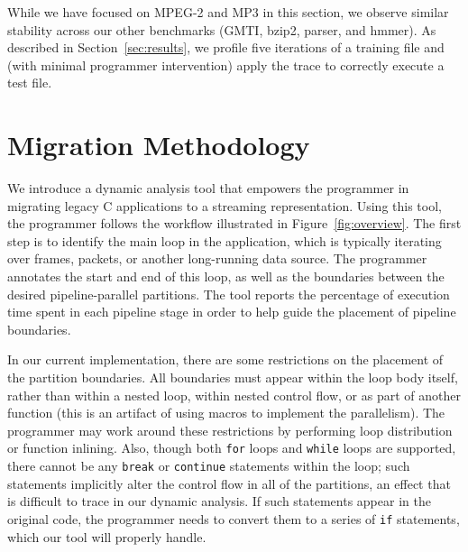 % 

While we have focused on MPEG-2 and MP3 in this section, we observe
similar stability across our other benchmarks (GMTI, bzip2, parser,
and hmmer).  As described in Section~\ref{sec:results}, we profile
five iterations of a training file and (with minimal programmer
intervention) apply the trace to correctly execute a test file.

\section{Migration Methodology}
\label{sec:workflow}

We introduce a dynamic analysis tool that empowers the programmer in
migrating legacy C applications to a streaming representation.  Using
this tool, the programmer follows the workflow illustrated in
Figure~\ref{fig:overview}.  The first step is to identify the main
loop in the application, which is typically iterating over frames,
packets, or another long-running data source.  The programmer
annotates the start and end of this loop, as well as the boundaries
between the desired pipeline-parallel partitions.  The tool reports
the percentage of execution time spent in each pipeline stage in order
to help guide the placement of pipeline boundaries.

In our current implementation, there are some restrictions on the
placement of the partition boundaries.  All boundaries must appear
within the loop body itself, rather than within a nested loop, within
nested control flow, or as part of another function (this is an
artifact of using macros to implement the parallelism).  The
programmer may work around these restrictions by performing loop
distribution or function inlining.  Also, though both {\tt for} loops
and {\tt while} loops are supported, there cannot be any {\tt break}
or {\tt continue} statements within the loop; such statements
implicitly alter the control flow in all of the partitions, an effect
that is difficult to trace in our dynamic analysis.  If such
statements appear in the original code, the programmer needs to
convert them to a series of {\tt if} statements, which our tool will
properly handle.

